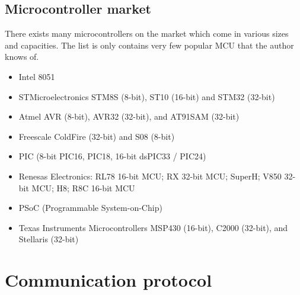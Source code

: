   \subsection{Microcontroller market}
  There exists many microcontrollers on the market which come in various sizes and capacities. The list is only contains very few popular MCU that the author knows of.
  \begin{itemize}
    \item Intel 8051
    \item STMicroelectronics STM8S (8-bit), ST10 (16-bit) and STM32 (32-bit)
    \item Atmel AVR (8-bit), AVR32 (32-bit), and AT91SAM (32-bit)
    \item Freescale ColdFire (32-bit) and S08 (8-bit)
    \item PIC (8-bit PIC16, PIC18, 16-bit dsPIC33 / PIC24)
    \item Renesas Electronics: RL78 16-bit MCU; RX 32-bit MCU; SuperH; V850 32-
    bit MCU; H8; R8C 16-bit MCU
    \item PSoC (Programmable System-on-Chip)
    \item Texas Instruments Microcontrollers MSP430 (16-bit), C2000 (32-bit), and
    Stellaris (32-bit)
  \end{itemize}

\section{Communication protocol}
  


